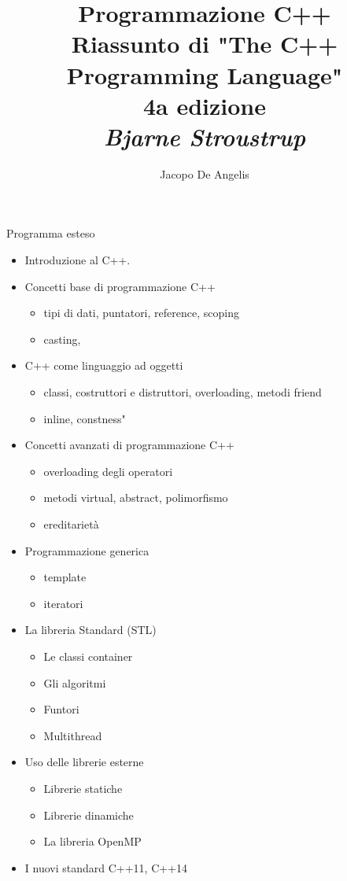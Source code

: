 \documentclass[11pt,a4paper]{book}
\begin{document}
\title{Programmazione C++ \\
	\large Riassunto di "The C++ Programming Language" \\
	4a edizione \\
	\textit{Bjarne Stroustrup}}
\author{Jacopo De Angelis}
\maketitle

\pagebreak
\tableofcontents
\pagebreak

\begin{LARGE}
Programma esteso
\end{LARGE}

\begin{itemize}
	\item Introduzione al C++.
	\item Concetti base di programmazione C++
	\begin{itemize}
		\item tipi di dati, puntatori,  reference, scoping
		\item casting,
	\end{itemize}

	\item C++ come linguaggio ad oggetti
	\begin{itemize}
		\item classi, costruttori e distruttori, overloading, metodi friend
		\item inline, constness"
	\end{itemize}
	\item Concetti avanzati di programmazione C++
	\begin{itemize}
		\item overloading degli operatori
		\item metodi virtual, abstract, polimorfismo
		\item ereditarietà
	\end{itemize}
	\item Programmazione generica
	\begin{itemize}
		\item template
		\item iteratori
	\end{itemize}
	\item La libreria Standard (STL)
	\begin{itemize}
		\item Le classi container
		\item Gli algoritmi
		\item Funtori
		\item Multithread
	\end{itemize}
	\item Uso delle librerie esterne
	\begin{itemize}
		\item Librerie statiche
		\item Librerie dinamiche
		\item La libreria OpenMP
	\end{itemize}
	\item I nuovi standard C++11, C++14


\end{itemize}
\end{document}
